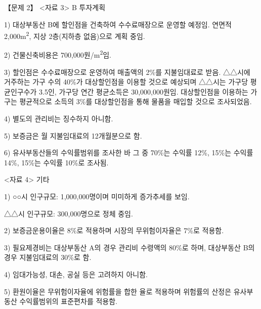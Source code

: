 \begin{longquestion}{【문제 2】}
<자료 3> B 투자계획 \par
1) 대상부동산 B에 할인점을 건축하여 수수료매장으로 운영할 예정임. 연면적 2,000m\textsuperscript{2}, 지상 2층(지하층 없음)으로 계획 중임. \par
2) 건물신축비용은 700,000원/m\textsuperscript{2}임. \par
3) 할인점은 수수료매장으로 운영하여 매출액의 2\%를 지불임대료로 받음. △△시에 거주하는 가구 수의 40\%가 대상할인점을 이용할 것으로 예상되며 △△시는 가구당 평균인구수가 3.5인, 가구당 연간 평균소득은 30,000,000원임. 대상할인점을 이용하는 가구는 평균적으로 소득의 3\%를 대상할인점을 통해 물품을 매입할 것으로 조사되었음. \par
4) 별도의 관리비는 징수하지 아니함. \par
5) 보증금은 월 지불임대료의 12개월분으로 함. \par
6) 유사부동산들의 수익률범위를 조사한 바 그 중 70\%는 수익률 12\%, 15\%는 수익률 14\%, 15\%는 수익률 10\%로 조사됨. \par
<자료 4> 기타 \par
1) ○○시 인구규모: 1,000,000명이며 미미하게 증가추세를 보임. \par
△△시 인구규모: 300,000명으로 정체 중임. \par
2) 보증금운용이율은 8\%로 적용하며 시장의 무위험이자율은 7\%로 적용함. \par
3) 필요제경비는 대상부동산 A의 경우 관리비 수령액의 80\%로 하며, 대상부동산 B의 경우 지불임대료의 30\%로 함. \par
4) 임대가능성, 대손, 공실 등은 고려하지 아니함. \par
5) 환원이율은 무위험이자율에 위험률을 합한 율로 적용하며 위험률의 산정은 유사부동산 수익률범위의 표준편차를 적용함. \par
\end{longquestion}
